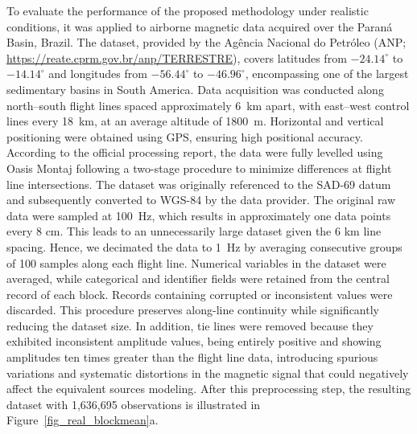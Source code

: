 To evaluate the performance of the proposed methodology under realistic
conditions, it was applied to airborne magnetic data acquired over the Paraná
Basin, Brazil.
The dataset, provided by the Agência Nacional do Petróleo (ANP;
\url{https://reate.cprm.gov.br/anp/TERRESTRE}), covers latitudes from
$-24.14^{\circ}$ to $-14.14^{\circ}$ and longitudes from $-56.44^{\circ}$ to
$-46.96^{\circ}$, encompassing one of the largest sedimentary basins in South
America. Data acquisition was conducted along north--south flight lines spaced
approximately 6~km apart, with east--west control lines every 18~km, at an
average altitude of 1800~m. Horizontal and vertical positioning were obtained
using GPS, ensuring high positional accuracy. According to the official
processing report, the data were fully levelled using Oasis Montaj following a
two-stage procedure to minimize differences at flight line intersections. The
dataset was originally referenced to the SAD-69 datum and subsequently
converted to WGS-84 by the data provider.
The original raw data were sampled at 100~Hz, which results in approximately
one data points every 8 cm.
This leads to an unnecessarily large dataset given the 6 km line spacing.
Hence, we decimated the data to 1~Hz by averaging consecutive groups of 100
samples along each flight line.
Numerical variables in the dataset were averaged, while categorical and identifier fields
were retained from the central record of each block. Records containing
corrupted or inconsistent values were discarded. This procedure preserves
along-line continuity while significantly reducing the dataset size. In
addition, tie lines were removed because they exhibited inconsistent amplitude values,
being entirely positive and showing amplitudes ten times greater than the
flight line data, introducing spurious variations and systematic
distortions in the magnetic signal that could negatively affect the equivalent
sources modeling. After this preprocessing step, the resulting dataset with
1,636,695 observations is illustrated in Figure~\ref{fig_real_blockmean}a.

